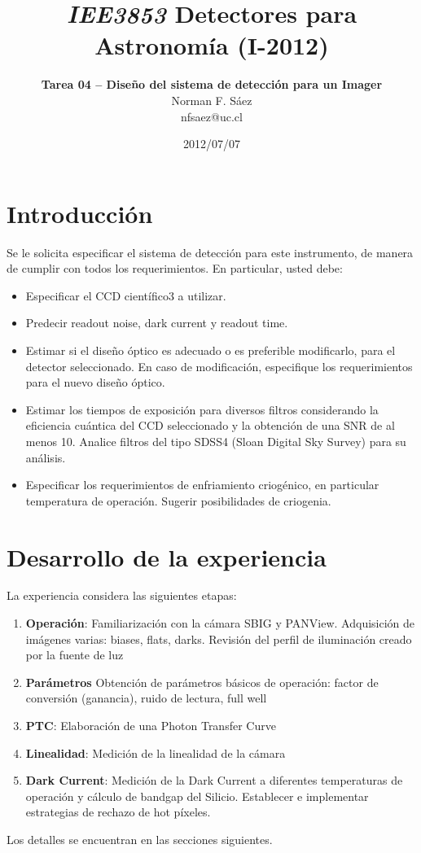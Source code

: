 \documentclass[a4paper,10pt]{article}
\title{\textit{IEE3853} Detectores para Astronomía (I-2012)}
\author{\textbf{Tarea 04 – Diseño del sistema de detección para un Imager} \\Norman F. Sáez\\nfsaez@uc.cl}
\date{2012/07/07}
\begin{document}
\maketitle
\section[1]{Introducción}
Se le solicita especificar el sistema de detección para este instrumento, de manera de cumplir con
todos los requerimientos. En particular, usted debe:


\begin{itemize}
\item Especificar el CCD científico3 a utilizar.

\item Predecir readout noise, dark current y readout time.

\item Estimar si el diseño óptico es adecuado o es preferible modificarlo, para
el detector seleccionado. En caso de modificación, especifique los
requerimientos para el nuevo diseño óptico.

\item Estimar los tiempos de exposición para diversos filtros considerando la
eficiencia cuántica del CCD seleccionado y la obtención de una SNR de al menos
10. Analice filtros del tipo SDSS4 (Sloan Digital Sky Survey) para su análisis.

\item Especificar los requerimientos de enfriamiento criogénico, en particular
temperatura de operación. Sugerir posibilidades de criogenia.
\end{itemize}

\section[1]{Desarrollo de la experiencia}
La experiencia considera las siguientes etapas:
\begin{enumerate}
\item \textbf{Operación}: Familiarización con la cámara SBIG y PANView. Adquisición de imágenes varias: biases, flats, darks. Revisión del perfil de iluminación creado por la fuente de luz
\item \textbf{Parámetros} Obtención de parámetros básicos de operación: factor de conversión (ganancia), ruido de lectura, full well
\item \textbf{PTC}: Elaboración de una Photon Transfer Curve
\item \textbf{Linealidad}: Medición de la linealidad de la cámara
\item \textbf{Dark Current}: Medición de la Dark Current a diferentes temperaturas de operación y cálculo de bandgap del Silicio. Establecer e implementar estrategias de rechazo de hot píxeles.
\end{enumerate}
Los detalles se encuentran en las secciones siguientes.
\end{document}
